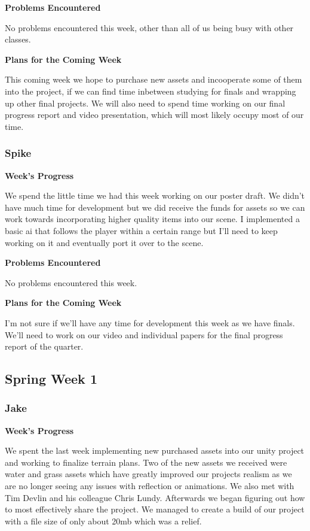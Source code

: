 \documentclass[10pt,journal,compsoc,onecolumn, draftclsnofoot]{IEEEtran}
\begin{document}
\noindent \textbf{Problems Encountered}

No problems encountered this week, other than all of us being busy with other classes.

\noindent \textbf{Plans for the Coming Week}

This coming week we hope to purchase new assets and incooperate some of them into the project, if we can find time inbetween studying for finals and wrapping up other final projects. We will also need to spend time working on our final progress report and video presentation, which will most likely occupy most of our time.

\subsubsection{Spike}
\noindent \textbf{Week's Progress}

We spend the little time we had this week working on our poster draft. We didn't have much time for development but we did receive the funds for assets so we can work towards incorporating higher quality items into our scene. I implemented a basic ai that follows the player within a certain range but I'll need to keep working on it and eventually port it over to the scene.

\noindent \textbf{Problems Encountered}

No problems encountered this week.

\noindent \textbf{Plans for the Coming Week}

I'm not sure if we'll have any time for development this week as we have finals. We'll need to work on our video and individual papers for the final progress report of the quarter.

\subsection{Spring Week 1}
\subsubsection{Jake}
\noindent \textbf{Week's Progress}

We spent the last week implementing new purchased assets into our unity project and working to finalize terrain plans. Two of the new assets we received were water and grass assets which have greatly improved our projects realism as we are no longer seeing any issues with reflection or animations. We also met with Tim Devlin and his colleague Chris Lundy. Afterwards we began figuring out how to most effectively share the project. We managed to create a build of our project with a file size of only about 20mb which was a relief.
\end{document}
